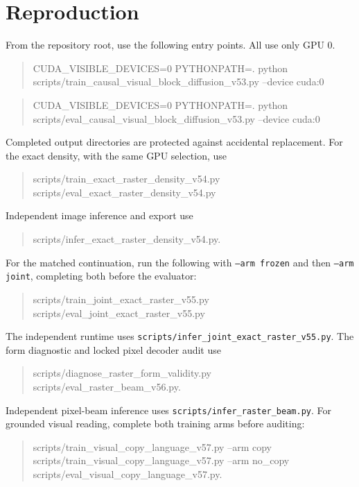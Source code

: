 \documentclass[10pt,a4paper]{article}
\providecommand{\DIFaddend}{} %
\begin{document}
\DIFaddend \section*{Reproduction}
From the repository root, use the following entry points. All use only GPU 0.
\begin{quote}\small\ttfamily
CUDA\_VISIBLE\_DEVICES=0 PYTHONPATH=. python\\
scripts/train\_causal\_visual\_block\_diffusion\_v53.py --device cuda:0
\end{quote}
\begin{quote}\small\ttfamily
CUDA\_VISIBLE\_DEVICES=0 PYTHONPATH=. python\\
scripts/eval\_causal\_visual\_block\_diffusion\_v53.py --device cuda:0
\end{quote}
Completed output directories are protected against accidental replacement.
For the exact density, with the same GPU selection, use
\begin{quote}\small\ttfamily
scripts/train\_exact\_raster\_density\_v54.py\\
scripts/eval\_exact\_raster\_density\_v54.py
\end{quote}
Independent image inference and export use
\begin{quote}\small\ttfamily
scripts/infer\_exact\_raster\_density\_v54.py.
\end{quote}
For the matched continuation, run the following with \texttt{--arm frozen}
and then \texttt{--arm joint}, completing both before the evaluator:
\begin{quote}\small\ttfamily
scripts/train\_joint\_exact\_raster\_v55.py\\
scripts/eval\_joint\_exact\_raster\_v55.py
\end{quote}
The independent runtime uses
\texttt{scripts/infer\_joint\_exact\_raster\_v55.py}.
The form diagnostic and locked pixel decoder audit use
\begin{quote}\small\ttfamily
scripts/diagnose\_raster\_form\_validity.py\\
scripts/eval\_raster\_beam\_v56.py.
\end{quote}
Independent pixel-beam inference uses
\texttt{scripts/infer\_raster\_beam.py}.
For grounded visual reading, complete both training arms before auditing:
\begin{quote}\small\ttfamily
scripts/train\_visual\_copy\_language\_v57.py --arm copy\\
scripts/train\_visual\_copy\_language\_v57.py --arm no\_copy\\
scripts/eval\_visual\_copy\_language\_v57.py.
\end{quote}
\end{document}
